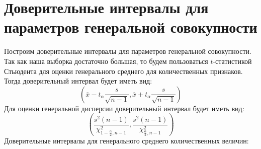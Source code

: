 \documentclass[12pt]{report}
\begin{document}
\section{Доверительные интервалы для параметров генеральной совокупности}
\par
Построим доверительные интервалы для параметров генеральной совокупности. Так как наша выборка достаточно большая, то будем пользоваться $t$-статистикой Стьюдента для оценки генерального среднего для количественных признаков. Тогда доверительный интервал будет иметь вид:
\[
    \left(\overline{x} - t_{\alpha} \dfrac{s}{\sqrt{n-1}}, \overline{x} + t_\alpha \dfrac{s}{\sqrt{n-1}}\right)
\]
Для оценки генеральной дисперсии доверительный интервал будет иметь вид:
\[
    \left(\dfrac{s^2(n-1)}{\chi^2_{1-\frac{\alpha}{2}, n-1}}, \dfrac{s^2(n-1)}{\chi^2_{\frac{\alpha}{2}, n-1}}\right)
\]
Доверительные интервалы для генерального среднего количественных величин:
\end{document}
